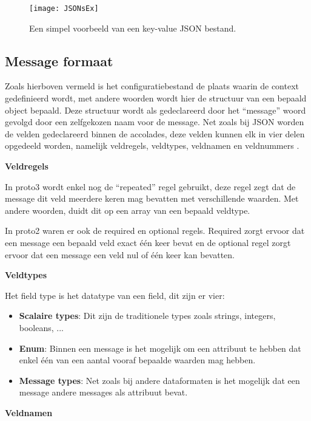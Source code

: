 \begin{figure}[H]
    \centering
    \texttt{[image: JSONsEx]}
    \caption[Simpel JSON key-value voorbeeld]{Een simpel voorbeeld van een key-value JSON bestand. \autocite{Kurian2020}}
    \label{fig:JSONsEx}
\end{figure}

\subsection{Message formaat}
\label{subsec:Message formaat}

Zoals hierboven vermeld is het configuratiebestand de plaats waarin de context gedefinieerd wordt, met andere woorden wordt hier de structuur van een bepaald object bepaald. Deze structuur wordt als gedeclareerd door het “message” woord gevolgd door een zelfgekozen naam voor de message. Net zoals bij JSON worden de velden gedeclareerd binnen de accolades, deze velden kunnen elk in vier delen opgedeeld worden, namelijk veldregels, veldtypes, veldnamen en veldnummers \autocite{Google2020}.

\textbf{Veldregels}

In proto3 wordt enkel nog de “repeated” regel gebruikt, deze regel zegt dat de message dit veld meerdere keren mag bevatten met verschillende waarden. Met andere woorden, duidt dit op een array van een bepaald veldtype.

In proto2 waren er ook de required en optional regels. Required zorgt ervoor dat een message een bepaald veld exact één keer bevat en de optional regel zorgt ervoor dat een message een veld nul of één keer kan bevatten.

\textbf{Veldtypes}

Het field type is het datatype van een field, dit zijn er vier:

\begin{itemize}
    \item \textbf{Scalaire types}: Dit zijn de traditionele types zoals strings, integers, booleans, ...
    \item \textbf{Enum}: Binnen een message is het mogelijk om een attribuut te hebben dat enkel één van een aantal vooraf bepaalde waarden mag hebben.
    \item \textbf{Message types}: Net zoals bij andere dataformaten is het mogelijk dat een message andere messages als attribuut bevat.
\end{itemize}

\textbf{Veldnamen}

